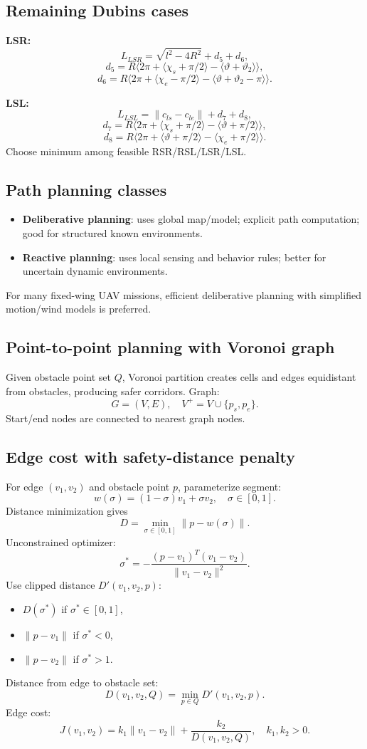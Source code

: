 \documentclass[11pt,a4paper]{article}
\begin{document}
\subsection{Remaining Dubins cases}
\textbf{LSR:}
\[
L_{LSR}=\sqrt{l^2-4R^2}+d_5+d_6,
\]
\[
d_5=R\langle2\pi+\langle\chi_s+\pi/2\rangle-\langle\vartheta+\vartheta_2\rangle\rangle,
\]
\[
d_6=R\langle2\pi+\langle\chi_e-\pi/2\rangle-\langle\vartheta+\vartheta_2-\pi\rangle\rangle.
\]

\textbf{LSL:}
\[
L_{LSL}=\|c_{ls}-c_{le}\|+d_7+d_8,
\]
\[
d_7=R\langle2\pi+\langle\chi_s+\pi/2\rangle-\langle\vartheta+\pi/2\rangle\rangle,
\]
\[
d_8=R\langle2\pi+\langle\vartheta+\pi/2\rangle-\langle\chi_e+\pi/2\rangle\rangle.
\]
Choose minimum among feasible RSR/RSL/LSR/LSL.

\subsection{Path planning classes}
\begin{itemize}
  \item \textbf{Deliberative planning}: uses global map/model; explicit path computation; good for structured known environments.
  \item \textbf{Reactive planning}: uses local sensing and behavior rules; better for uncertain dynamic environments.
\end{itemize}
For many fixed-wing UAV missions, efficient deliberative planning with simplified motion/wind models is preferred.

\subsection{Point-to-point planning with Voronoi graph}
Given obstacle point set $Q$, Voronoi partition creates cells and edges equidistant from obstacles, producing safer corridors.
Graph:
\[
G=(V,E),\quad V^+=V\cup\{p_s,p_e\}.
\]
Start/end nodes are connected to nearest graph nodes.

\subsection{Edge cost with safety-distance penalty}
For edge $(v_1,v_2)$ and obstacle point $p$, parameterize segment:
\[
w(\sigma)=(1-\sigma)v_1+\sigma v_2,\quad \sigma\in[0,1].
\]
Distance minimization gives
\[
D=\min_{\sigma\in[0,1]}\|p-w(\sigma)\|.
\]
Unconstrained optimizer:
\[
\sigma^*=-\frac{(p-v_1)^T(v_1-v_2)}{\|v_1-v_2\|^2}.
\]
Use clipped distance $D'(v_1,v_2,p)$:
\begin{itemize}
  \item $D(\sigma^*)$ if $\sigma^*\in[0,1]$,
  \item $\|p-v_1\|$ if $\sigma^*<0$,
  \item $\|p-v_2\|$ if $\sigma^*>1$.
\end{itemize}
Distance from edge to obstacle set:
\[
D(v_1,v_2,Q)=\min_{p\in Q}D'(v_1,v_2,p).
\]
Edge cost:
\[
J(v_1,v_2)=k_1\|v_1-v_2\|+\frac{k_2}{D(v_1,v_2,Q)},\quad k_1,k_2>0.
\]
\end{document}
